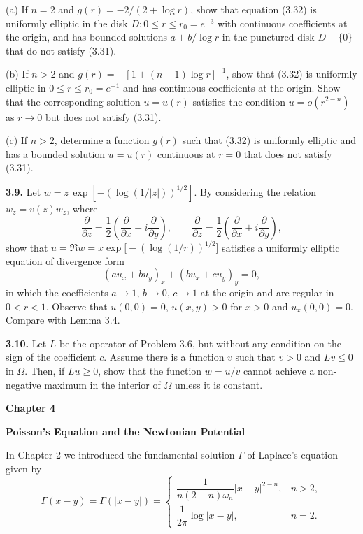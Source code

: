 \quad (a) If $n=2$ and $g(r)=-2/(2+\log r)$, show that equation (3.32) is uniformly elliptic in the disk $D:0\leq r\leq r_0=e^{-3}$ with continuous coefficients at the origin, and has bounded solutions $a+b/\log r$ in the punctured disk $D-\{0\}$ that do not satisfy (3.31).

\quad (b) If $n>2$ and $g(r)=-[1+(n-1)\log r]^{-1}$, show that (3.32) is uniformly elliptic in $0\leq r\leq r_0=e^{-1}$ and has continuous coefficients at the origin. Show that the corresponding solution $u=u(r)$ satisfies the condition $u=o(r^{2-n})$ as $r\to 0$ but does not satisfy (3.31).

\quad (c) If $n>2$, determine a function $g(r)$ such that (3.32) is uniformly elliptic and has a bounded solution $u=u(r)$ continuous at $r=0$ that does not satisfy (3.31).

\textbf{3.9.} \quad Let $w=z\,\exp\!\left[-(\log (1/|z|))^{1/2}\right]$. By considering the relation $w_{\bar z}=v(z)w_z$, where
\[
\frac{\partial}{\partial z}=\frac{1}{2}\left(\frac{\partial}{\partial x}-i\frac{\partial}{\partial y}\right),\qquad
\frac{\partial}{\partial \bar z}=\frac{1}{2}\left(\frac{\partial}{\partial x}+i\frac{\partial}{\partial y}\right),
\]
show that $u=\Re w=x\exp\bigl[-(\log(1/r))^{1/2}\bigr]$ satisfies a uniformly elliptic equation of divergence form
\[
(au_x+bu_y)_x+(bu_x+cu_y)_y=0,
\]
in which the coefficients $a\to 1$, $b\to 0$, $c\to 1$ at the origin and are regular in $0<r<1$. Observe that $u(0,0)=0$, $u(x,y)>0$ for $x>0$ and $u_x(0,0)=0$. Compare with Lemma 3.4.

\textbf{3.10.} Let $L$ be the operator of Problem 3.6, but without any condition on the sign of the coefficient $c$. Assume there is a function $v$ such that $v>0$ and $Lv\leq 0$ in $\Omega$. Then, if $Lu\geq 0$, show that the function $w=u/v$ cannot achieve a non-negative maximum in the interior of $\Omega$ unless it is constant.


\textbf{Chapter 4}

\begin{center}
\textbf{Poisson's Equation and the Newtonian Potential}
\end{center}

In Chapter 2 we introduced the fundamental solution $\Gamma$ of Laplace's equation given by
\begin{equation}
\Gamma(x-y)=\Gamma(|x-y|)=
\begin{cases}
\dfrac{1}{n(2-n)\omega_n}|x-y|^{2-n}, & n>2,\\[1.2ex]
\dfrac{1}{2\pi}\log |x-y|, & n=2.
\end{cases}
\tag{4.1}
\end{equation}

